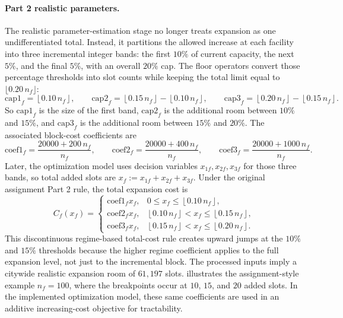 \documentclass[11pt]{article}
\begin{document}
\paragraph{Part 2 realistic parameters.}
The realistic parameter-estimation stage no longer treats expansion as one undifferentiated total. Instead, it partitions the allowed increase at each facility into three incremental integer bands: the first \(10\%\) of current capacity, the next \(5\%\), and the final \(5\%\), with an overall \(20\%\) cap. The floor operators convert those percentage thresholds into slot counts while keeping the total limit equal to \(\lfloor 0.20\,n_f \rfloor\):
\[
\mathrm{cap1}_f = \left\lfloor 0.10\,n_f \right\rfloor,\qquad
\mathrm{cap2}_f = \left\lfloor 0.15\,n_f \right\rfloor - \left\lfloor 0.10\,n_f \right\rfloor,\qquad
\mathrm{cap3}_f = \left\lfloor 0.20\,n_f \right\rfloor - \left\lfloor 0.15\,n_f \right\rfloor.
\]
So \(\mathrm{cap1}_f\) is the size of the first band, \(\mathrm{cap2}_f\) is the additional room between \(10\%\) and \(15\%\), and \(\mathrm{cap3}_f\) is the additional room between \(15\%\) and \(20\%\). The associated block-cost coefficients are
\[
\mathrm{coef1}_f = \frac{20000 + 200\,n_f}{n_f},\qquad
\mathrm{coef2}_f = \frac{20000 + 400\,n_f}{n_f},\qquad
\mathrm{coef3}_f = \frac{20000 + 1000\,n_f}{n_f}.
\]
Later, the optimization model uses decision variables \(x_{1f},x_{2f},x_{3f}\) for those three bands, so total added slots are \(x_f := x_{1f}+x_{2f}+x_{3f}\). Under the original assignment Part 2 rule, the total expansion cost is
\[
C_f(x_f)=
\begin{cases}
\mathrm{coef1}_f x_f, & 0 \le x_f \le \left\lfloor 0.10\,n_f \right\rfloor,\\
\mathrm{coef2}_f x_f, & \left\lfloor 0.10\,n_f \right\rfloor < x_f \le \left\lfloor 0.15\,n_f \right\rfloor,\\
\mathrm{coef3}_f x_f, & \left\lfloor 0.15\,n_f \right\rfloor < x_f \le \left\lfloor 0.20\,n_f \right\rfloor.
\end{cases}
\]
This discontinuous regime-based total-cost rule creates upward jumps at the \(10\%\) and \(15\%\) thresholds because the higher regime coefficient applies to the full expansion level, not just to the incremental block. The processed inputs imply a citywide realistic expansion room of \(61{,}197\) slots.  illustrates the assignment-style example \(n_f=100\), where the breakpoints occur at \(10\), \(15\), and \(20\) added slots. In the implemented optimization model, these same coefficients are used in an additive increasing-cost objective for tractability.
\end{document}
